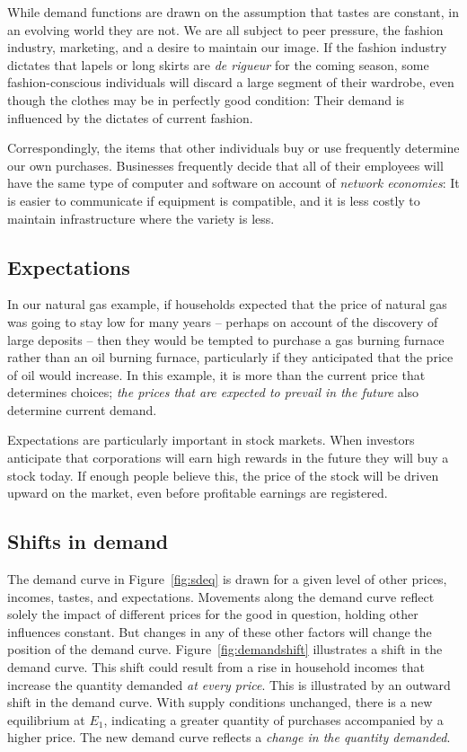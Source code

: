 While demand functions are drawn on the assumption that tastes are constant, in an evolving world they are not. We are all subject to peer pressure, the fashion industry, marketing, and a desire to maintain our image. If the fashion industry dictates that lapels or long skirts are \textit{de rigueur} for the coming season, some fashion-conscious individuals will discard a large segment of their wardrobe, even though the clothes may be in perfectly good condition: Their demand is influenced by the dictates of current fashion. 

Correspondingly, the items that other individuals buy or use frequently determine our own purchases. Businesses frequently decide that all of their employees will have the same type of computer and software on account of \textit{network economies}: It is easier to communicate if equipment is compatible, and it is less costly to maintain infrastructure where the variety is less.  

\subsection*{Expectations}

In our natural gas example, if households expected that the price of natural gas was going to stay low for many years -- perhaps on account of the discovery of large deposits -- then they would be tempted to purchase a gas burning furnace rather than an oil burning furnace, particularly if they anticipated that the price of oil would increase. In this example, it is more than the current price that determines choices; \textit{the prices that are expected to prevail in the future} also determine current demand.

Expectations are particularly important in stock markets. When investors anticipate that corporations will earn high rewards in the future they will buy a stock today. If enough people believe this, the price of the stock will be driven upward on the market, even before profitable earnings are registered.

\subsection*{Shifts in demand}

The demand curve in Figure~\ref{fig:sdeq} is drawn for a given level of other prices, incomes, tastes, and expectations. Movements along the demand curve reflect solely the impact of different prices for the good in question, holding other influences constant. But changes in any of these other factors will change the position of the demand curve. Figure~\ref{fig:demandshift} illustrates a shift in the demand curve. This shift could result from a rise in household incomes that increase the quantity demanded \textit{at every price}. This is illustrated by an outward shift in the demand curve. With supply conditions unchanged, there is a new equilibrium at $E_1$, indicating a greater quantity of purchases accompanied by a higher price. The new demand curve reflects a \textit{change in the quantity demanded}.

